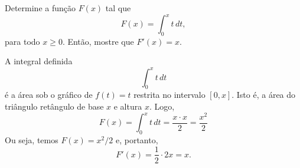 \cleardoublepage\documentclass[../main.tex]{subfiles}
\begin{document}
\begin{exeresol}
  Determine a função $F(x)$ tal que
  \begin{equation*}
    F(x) = \int_0^x t\,dt,
  \end{equation*}
  para todo $x\geq 0$. Então, mostre que $F'(x) = x$.
\end{exeresol}
\begin{resol}
  A integral definida
  \begin{equation*}
    \int_0^x t\,dt
  \end{equation*}
  é a área sob o gráfico de $f(t) = t$ restrita no intervalo $[0, x]$. Isto é, a área do triângulo retângulo de base $x$ e altura $x$. Logo,
  \begin{equation*}
    F(x) = \int_0^x t\,dt = \frac{x\cdot x}{2} = \frac{x^2}{2}
  \end{equation*}
  Ou seja, temos $F(x) = x^2/2$ e, portanto,
  \begin{equation*}
    F'(x) = \frac{1}{2}\cdot 2x = x.
  \end{equation*}
\end{resol}
\end{document}
